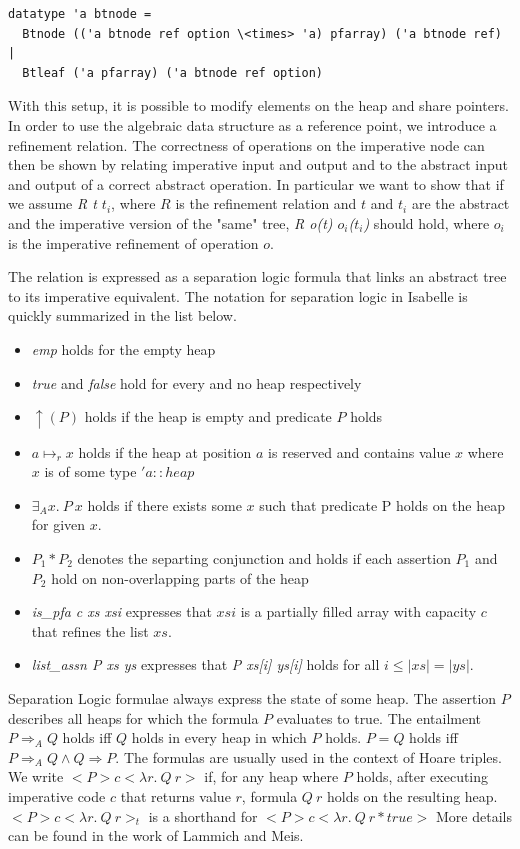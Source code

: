 \documentclass[a4paper,UKenglish,cleveref, autoref, thm-restate]{lipics-v2021}
\begin{document}
\begin{lstlisting}[mathescape=true, language=Isabelle,label=lst:btree-imp-def]
datatype 'a btnode =
  Btnode (('a btnode ref option \<times> 'a) pfarray) ('a btnode ref) |
  Btleaf ('a pfarray) ('a btnode ref option)
\end{lstlisting}

With this setup, it is possible to modify elements on the heap and share pointers.
In order to use the algebraic data structure as a reference point,
we introduce a refinement relation.
The correctness of operations on the imperative node
can then be shown by relating imperative input and output
and to the abstract input and output of a correct abstract operation.
In particular we want to show that if we assume \emph{R t $t_i$},
where $R$ is the refinement relation and $t$ and $t_i$ are the abstract
and the imperative version of the "same" tree,
\emph{R o(t) $o_i$($t_i$)} should hold, where $o_i$ is the imperative refinement
of operation $o$.

The relation is expressed as a separation logic formula that links an abstract tree to its
imperative equivalent.
The notation for separation logic in Isabelle is quickly summarized in the list below.
\begin{itemize}
    \item \textit{emp} holds for the empty heap
    \item \textit{true} and \textit{false} hold for every and no heap respectively
    \item $\uparrow(P)$ holds if the heap is empty and predicate $P$ holds
    \item $a \mapsto_r x$ holds if the heap at position $a$ is reserved and contains
    value $x$ where $x$ is of some type $'a::heap$
    \item $\exists_A x.\ P\ x$ holds if there exists some $x$ such that predicate P
    holds on the heap for given $x$.
    \item $P_1 * P_2$ denotes the separting conjunction and holds if each assertion $P_1$ and $P_2$ hold on non-overlapping parts
    of the heap
    \item \emph{is\_pfa c xs xsi} expresses that $xsi$ is a partially filled array
    with capacity $c$ that refines the list $xs$.
    \item \emph{list\_assn P xs ys} expresses that \emph{P xs[i] ys[i]} holds for all $i \leq |xs| = |ys|$.
\end{itemize}
Separation Logic formulae always express the state of some heap.
The assertion $P$ describes all heaps for which the formula $P$ evaluates to true.
The entailment $P \Longrightarrow_A Q$ holds iff $Q$ holds in every heap in which $P$ holds.
$P = Q$ holds iff $P \Longrightarrow_A Q \wedge Q \Longrightarrow P$.
The formulas are usually used in the context of Hoare triples.
We write $<P> c <\lambda r.\ Q\ r>$ if, for any heap where $P$ holds, after executing
imperative code $c$ that returns value $r$, formula $Q\ r$ holds on the resulting heap.
$<P> c <\lambda r.\ Q\ r>_t$ is a shorthand for $<P> c <\lambda r.\ Q\ r * \mathit{true}>$
More details can be found in the work of Lammich and Meis. \cite{DBLP:journals/afp/LammichM12}
\end{document}
